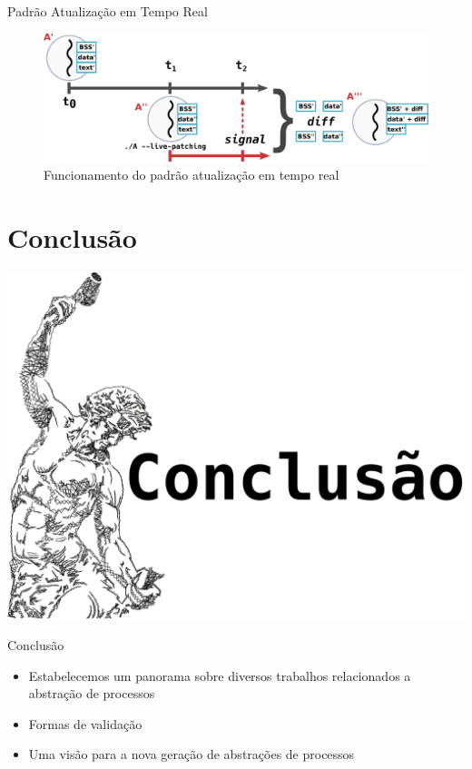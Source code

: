 \documentclass[xcolor={usenames,svgnames,dvipsnames},brazil,english,12pt,aspectratio=149]{beamer}
\begin{document}
\begin{frame}{Padrão Atualização em Tempo Real}
  \begin{figure}[!h]
    \centering
    \includegraphics[width=\textwidth]{live-patching}
    \caption*{Funcionamento do padrão atualização em tempo real}
  \end{figure}
\end{frame}

\section{Conclusão}

\begin{frame}[plain]
  \includegraphics[width=.9\textwidth]{self-made}
\end{frame}

\begin{frame}{Conclusão}
  \begin{itemize}
    \item Estabelecemos um panorama sobre diversos trabalhos relacionados a
          abstração de processos
    \item Formas de validação
    \item Uma visão para a nova geração de abstrações de processos
  \end{itemize}
\end{frame}
\end{document}
